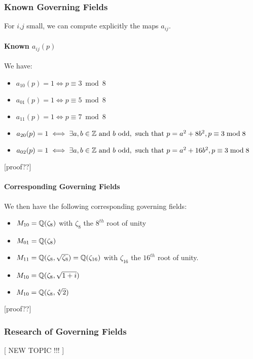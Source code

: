 \subsubsection{Known Governing Fields}
For $i$,$j$ small, we can compute explicitly the maps $a_{ij}$.
\paragraph{Known $a_{ij}(p)$}
We have:
\begin{itemize}
	\item $a_{10}(p)=1 \iff p \equiv 3 \bmod 8$
	\item $a_{01}(p)=1 \iff p \equiv 5 \bmod 8$
	\item $a_{11}(p)=1 \iff p \equiv 7 \bmod 8$
	\item $a_{20}(p)=1 \iff \exists a,b \in \mathbb{Z} \text{ and } b \text{ odd},\text{ such that } p=a^2+8b^2, p \equiv 3 \bmod 8$
	\item $a_{02}(p)=1 \iff \exists a,b \in \mathbb{Z} \text{ and } b \text{ odd},\text{ such that } p=a^2+16b^2, p \equiv 3 \bmod 8$
\end{itemize}
\cite[§7]{StructureAlgebreHecke}
[proof??]

\paragraph{Corresponding Governing Fields}
We then have the following corresponding governing fields:
\begin{itemize}
	\item $M_{10} = \mathbb{Q}(\zeta_8)$ with $\zeta_8$ the $8^{th}$ root of unity
	\item $M_{01} = \mathbb{Q}(\zeta_8)$
	\item $M_{11} = \mathbb{Q}(\zeta_8, \sqrt{\zeta_8}) = \mathbb{Q}(\zeta_{16})$ with $\zeta_{16}$ the $16^{th}$ root of unity.
	\item $M_{10} = \mathbb{Q}(\zeta_8, \sqrt{1+i})$
	\item $M_{10} = \mathbb{Q}(\zeta_8, \sqrt[4]{2})$
\end{itemize}
\cite[§7]{StructureAlgebreHecke}
[proof??]




\subsubsection{Research of Governing Fields}
[ NEW TOPIC !!! ]









